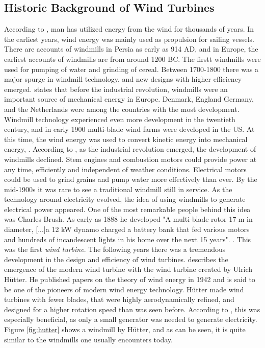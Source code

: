 \subsection{Historic Background of Wind Turbines}
According to \cite{Wagner2013}, man has utilized energy from the wind for thousands of years. In the earliest years, wind energy was mainly used as propulsion for sailing vessels. There are accounts of windmills in Persia as early as 914 AD, and in Europe, the earliest accounts of windmills are from around 1200 BC. The firstt windmills were used for pumping of water and grinding of cereal. Between 1700-1800 there was a major spurge in windmill technology, and new designs with higher efficiency emerged. \cite{Lynn2011} states that before the industrial revolution, windmills were an important source of mechanical energy in Europe. Denmark, England Germany, and the Netherlands were among the countries with the most development. Windmill technology experienced even more development in the twentieth century, and in early 1900 multi-blade wind farms were developed in the US. At this time, the wind energy was used to convert kinetic energy into mechanical energy, \cite{Hau2013}. According to \cite{Lynn2011}, as the industrial revolution emerged, the development of windmills declined. Stem engines and combustion motors could provide power at any time, efficiently and independent of weather conditions. Electrical motors could be used to grind grains and pump water more effectively than ever. By the mid-1900s it was rare to see a traditional windmill still in service. \newline 
\newline
As the technology around electricity evolved, the idea of using windmills to generate electrical power appeared. One of the most remarkable people behind this idea was Charles Brush. As early as 1888 he developed "A multi-blade rotor 17 m in diameter, [...]a 12 kW dynamo charged a battery bank that fed various motors and hundreds of incandescent lights in his home over the next 15 years". \cite{Lynn2011}. This was the first \textit{wind turbine}. The following years there was a tremendous development in the design and efficiency of wind turbines. \cite{Hau2013} describes the emergence of the modern wind turbine with the wind turbine created by Ulrich Hütter. He published papers on the theory of wind energy in 1942 and is said to be one of the pioneers of modern wind energy technology. Hütter made wind turbines with fewer blades, that were highly aerodynamically refined, and designed for a higher rotation speed than was seen before. According to \cite{Wagner2013}, this was especially beneficial, as only a small generator was needed to generate electricity. Figure \ref{fig:hutter} shows a windmill by Hütter, and as can be seen, it is quite similar to the windmills one usually encounters today. \newline
\newline

